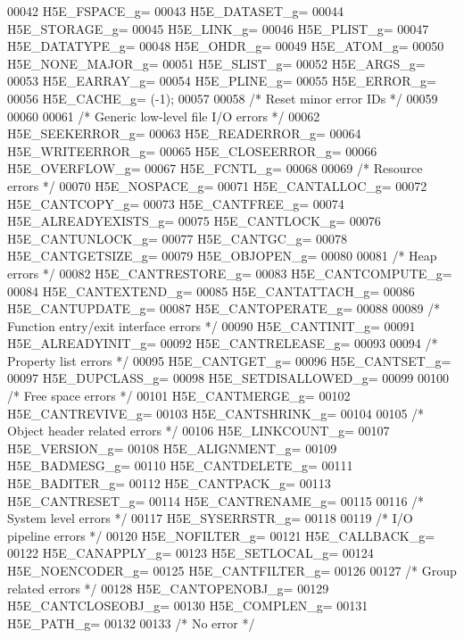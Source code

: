 \begin{DoxyCode}
00042 H5E\_FSPACE\_g=    
00043 H5E\_DATASET\_g=    
00044 H5E\_STORAGE\_g=    
00045 H5E\_LINK\_g=    
00046 H5E\_PLIST\_g=    
00047 H5E\_DATATYPE\_g=    
00048 H5E\_OHDR\_g=    
00049 H5E\_ATOM\_g=    
00050 H5E\_NONE\_MAJOR\_g=    
00051 H5E\_SLIST\_g=    
00052 H5E\_ARGS\_g=    
00053 H5E\_EARRAY\_g=    
00054 H5E\_PLINE\_g=    
00055 H5E\_ERROR\_g=    
00056 H5E\_CACHE\_g= (-1);
00057 
00058 \textcolor{comment}{/* Reset minor error IDs */}
00059 
00060 
00061 \textcolor{comment}{/* Generic low-level file I/O errors */}    
00062 H5E\_SEEKERROR\_g=    
00063 H5E\_READERROR\_g=    
00064 H5E\_WRITEERROR\_g=    
00065 H5E\_CLOSEERROR\_g=    
00066 H5E\_OVERFLOW\_g=    
00067 H5E\_FCNTL\_g=
00068 
00069 \textcolor{comment}{/* Resource errors */}    
00070 H5E\_NOSPACE\_g=    
00071 H5E\_CANTALLOC\_g=    
00072 H5E\_CANTCOPY\_g=    
00073 H5E\_CANTFREE\_g=    
00074 H5E\_ALREADYEXISTS\_g=    
00075 H5E\_CANTLOCK\_g=    
00076 H5E\_CANTUNLOCK\_g=    
00077 H5E\_CANTGC\_g=    
00078 H5E\_CANTGETSIZE\_g=    
00079 H5E\_OBJOPEN\_g=
00080 
00081 \textcolor{comment}{/* Heap errors */}    
00082 H5E\_CANTRESTORE\_g=    
00083 H5E\_CANTCOMPUTE\_g=    
00084 H5E\_CANTEXTEND\_g=    
00085 H5E\_CANTATTACH\_g=    
00086 H5E\_CANTUPDATE\_g=    
00087 H5E\_CANTOPERATE\_g=
00088 
00089 \textcolor{comment}{/* Function entry/exit interface errors */}    
00090 H5E\_CANTINIT\_g=    
00091 H5E\_ALREADYINIT\_g=    
00092 H5E\_CANTRELEASE\_g=
00093 
00094 \textcolor{comment}{/* Property list errors */}    
00095 H5E\_CANTGET\_g=    
00096 H5E\_CANTSET\_g=    
00097 H5E\_DUPCLASS\_g=    
00098 H5E\_SETDISALLOWED\_g=
00099 
00100 \textcolor{comment}{/* Free space errors */}    
00101 H5E\_CANTMERGE\_g=    
00102 H5E\_CANTREVIVE\_g=    
00103 H5E\_CANTSHRINK\_g=
00104 
00105 \textcolor{comment}{/* Object header related errors */}    
00106 H5E\_LINKCOUNT\_g=    
00107 H5E\_VERSION\_g=    
00108 H5E\_ALIGNMENT\_g=    
00109 H5E\_BADMESG\_g=    
00110 H5E\_CANTDELETE\_g=    
00111 H5E\_BADITER\_g=    
00112 H5E\_CANTPACK\_g=    
00113 H5E\_CANTRESET\_g=    
00114 H5E\_CANTRENAME\_g=
00115 
00116 \textcolor{comment}{/* System level errors */}    
00117 H5E\_SYSERRSTR\_g=
00118 
00119 \textcolor{comment}{/* I/O pipeline errors */}    
00120 H5E\_NOFILTER\_g=    
00121 H5E\_CALLBACK\_g=    
00122 H5E\_CANAPPLY\_g=    
00123 H5E\_SETLOCAL\_g=    
00124 H5E\_NOENCODER\_g=    
00125 H5E\_CANTFILTER\_g=
00126 
00127 \textcolor{comment}{/* Group related errors */}    
00128 H5E\_CANTOPENOBJ\_g=    
00129 H5E\_CANTCLOSEOBJ\_g=    
00130 H5E\_COMPLEN\_g=    
00131 H5E\_PATH\_g=
00132 
00133 \textcolor{comment}{/* No error */}    

\end{DoxyCode}
